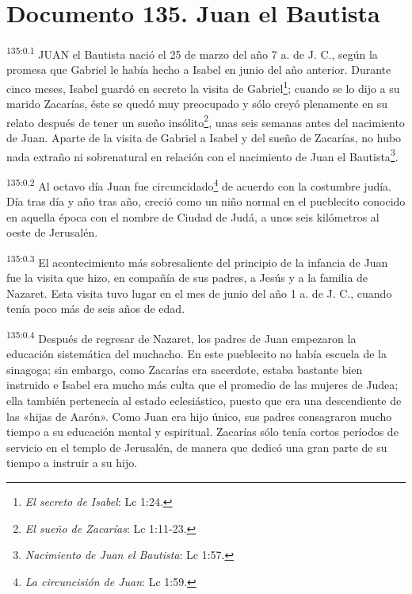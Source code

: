 \chapter{Documento 135. Juan el Bautista}
\par
\textsuperscript{135:0.1} JUAN el Bautista nació el 25 de marzo del año 7 a. de J. C., según la promesa que Gabriel le había hecho a Isabel en junio del año anterior. Durante cinco meses, Isabel guardó en secreto la visita de Gabriel\footnote{\textit{El secreto de Isabel}: Lc 1:24.}; cuando se lo dijo a su marido Zacarías, éste se quedó muy preocupado y sólo creyó plenamente en su relato después de tener un sueño insólito\footnote{\textit{El sueño de Zacarías}: Lc 1:11-23.}, unas seis semanas antes del nacimiento de Juan. Aparte de la visita de Gabriel a Isabel y del sueño de Zacarías, no hubo nada extraño ni sobrenatural en relación con el nacimiento de Juan el Bautista\footnote{\textit{Nacimiento de Juan el Bautista}: Lc 1:57.}.

\par
\textsuperscript{135:0.2} Al octavo día Juan fue circuncidado\footnote{\textit{La circuncisión de Juan}: Lc 1:59.} de acuerdo con la costumbre judía. Día tras día y año tras año, creció como un niño normal en el pueblecito conocido en aquella época con el nombre de Ciudad de Judá, a unos seis kilómetros al oeste de Jerusalén.

\par
\textsuperscript{135:0.3} El acontecimiento más sobresaliente del principio de la infancia de Juan fue la visita que hizo, en compañía de sus padres, a Jesús y a la familia de Nazaret. Esta visita tuvo lugar en el mes de junio del año 1 a. de J. C., cuando tenía poco más de seis años de edad.

\par
\textsuperscript{135:0.4} Después de regresar de Nazaret, los padres de Juan empezaron la educación sistemática del muchacho. En este pueblecito no había escuela de la sinagoga; sin embargo, como Zacarías era sacerdote, estaba bastante bien instruido e Isabel era mucho más culta que el promedio de las mujeres de Judea; ella también pertenecía al estado eclesiástico, puesto que era una descendiente de las «hijas de Aarón». Como Juan era hijo único, sus padres consagraron mucho tiempo a su educación mental y espiritual. Zacarías sólo tenía cortos períodos de servicio en el templo de Jerusalén, de manera que dedicó una gran parte de su tiempo a instruir a su hijo.

